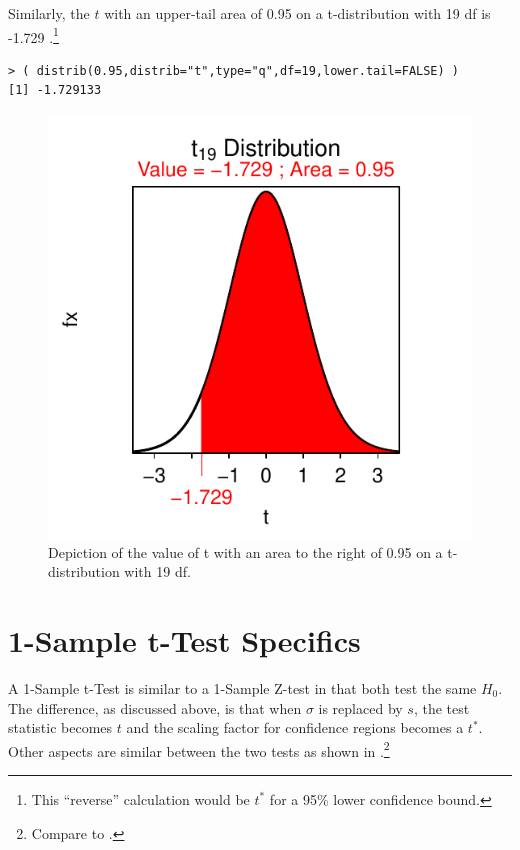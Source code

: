\documentclass[10pt,openany]{book}\usepackage[]{graphicx}\usepackage[]{color}
\makeatletter
\newenvironment{kframe}{%
 \def\at@end@of@kframe{}%
 \ifinner\ifhmode%
  \def\at@end@of@kframe{\end{minipage}}%
  \begin{minipage}{\columnwidth}%
 \fi\fi%
 \def\FrameCommand##1{\hskip\@totalleftmargin \hskip-\fboxsep
 \colorbox{shadecolor}{##1}\hskip-\fboxsep
     \hskip-\linewidth \hskip-\@totalleftmargin \hskip\columnwidth}%
 \MakeFramed {\advance\hsize-\width
   \@totalleftmargin\z@ \linewidth\hsize
   \@setminipage}}%
 {\par\unskip\endMakeFramed%
 \at@end@of@kframe}
\newenvironment{knitrout}{}{} %
\makeatother
\begin{document}
Similarly, the $t$ with an upper-tail area of 0.95 on a t-distribution with 19 df is -1.729 .\footnote{This ``reverse'' calculation would be $t^{*}$ for a 95\% lower confidence bound.}
\begin{knitrout}
\color{fgcolor}\begin{kframe}
\begin{verbatim}
> ( distrib(0.95,distrib="t",type="q",df=19,lower.tail=FALSE) )
[1] -1.729133
\end{verbatim}
\end{kframe}\begin{figure}[hbtp]

{\centering \includegraphics[width=.4\linewidth]{Figs/tstar1-1} 

}

\caption[Depiction of the value of t with an area to the right of 0.95 on a t-distribution with 19 df]{Depiction of the value of t with an area to the right of 0.95 on a t-distribution with 19 df.}\label{fig:tstar1}
\end{figure}


\end{knitrout}


\section{1-Sample t-Test Specifics} \label{sect:t1test}
A 1-Sample t-Test is similar to a 1-Sample Z-test in that both test the same $H_{0}$. The difference, as discussed above, is that when $\sigma$ is replaced by $s$, the test statistic becomes $t$ and the scaling factor for confidence regions becomes a $t^{*}$. Other aspects are similar between the two tests as shown in .\footnote{Compare  to .}
\end{document}
